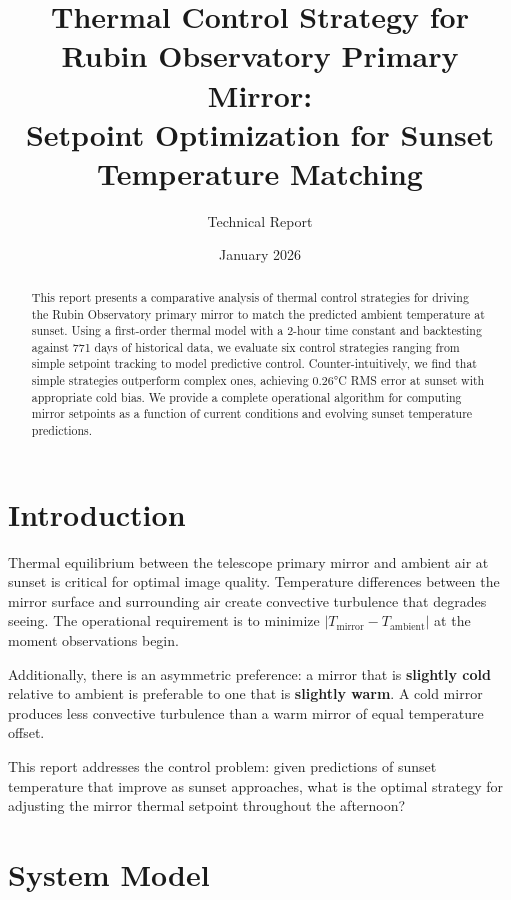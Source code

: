 \documentclass[11pt,letterpaper]{article}
\title{Thermal Control Strategy for Rubin Observatory Primary Mirror:\\
Setpoint Optimization for Sunset Temperature Matching}
\author{Technical Report}
\date{January 2026}
\begin{document}
\maketitle

\begin{abstract}
This report presents a comparative analysis of thermal control strategies for driving the Rubin Observatory primary mirror to match the predicted ambient temperature at sunset. Using a first-order thermal model with a 2-hour time constant and backtesting against 771 days of historical data, we evaluate six control strategies ranging from simple setpoint tracking to model predictive control. Counter-intuitively, we find that simple strategies outperform complex ones, achieving 0.26°C RMS error at sunset with appropriate cold bias. We provide a complete operational algorithm for computing mirror setpoints as a function of current conditions and evolving sunset temperature predictions.
\end{abstract}

\tableofcontents
\newpage

\section{Introduction}

Thermal equilibrium between the telescope primary mirror and ambient air at sunset is critical for optimal image quality. Temperature differences between the mirror surface and surrounding air create convective turbulence that degrades seeing. The operational requirement is to minimize $|T_{\text{mirror}} - T_{\text{ambient}}|$ at the moment observations begin.

Additionally, there is an asymmetric preference: a mirror that is \textbf{slightly cold} relative to ambient is preferable to one that is \textbf{slightly warm}. A cold mirror produces less convective turbulence than a warm mirror of equal temperature offset.

This report addresses the control problem: given predictions of sunset temperature that improve as sunset approaches, what is the optimal strategy for adjusting the mirror thermal setpoint throughout the afternoon?

\section{System Model}
\end{document}

